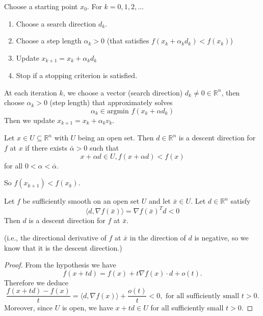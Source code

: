 Choose a starting point $x_0$. For $k = 0,1,2,\ldots$
\begin{enumerate}
  \item Choose a search direction $d_k$.
  \item Choose a step length $\alpha_k > 0$ (that satisfies $f(x_k + \alpha_k d_k) < f(x_k)$)
  \item Update $x_{k+1} = x_k + \alpha_k d_k$
  \item Stop if a stopping criterion is satisfied.
\end{enumerate}
\begin{definition}
  At each iteration $k$, we choose a vector (search direction) $d_k \neq 0 \in \mathbb R^n$, then choose $\alpha_k > 0$ (step length) that approximately solves
$$\alpha_k \in \text{argmin } f(x_k + \alpha d_k)$$
Then we update $x_{k+1} = x_k + \alpha_k v_k$.
\end{definition}
\begin{definition}
  Let $x \in U \subseteq \mathbb R^n$ with $U$ being an open set. Then $d \in \mathbb R^n$ is a descent direction for $f$ at $x$ if there exists $\bar \alpha > 0$ such that $$x + \alpha d \in U, f(x + \alpha d) < f(x)$$ for all $0 < \alpha < \bar \alpha$.

  \bigskip So $f(x_{k+1}) < f(x_k)$.
\end{definition}
\begin{lemma}
  Let $f$ be sufficiently smooth on an open set $U$ and let $\bar x \in U$. Let $d \in \mathbb R^n$ satisfy $$\langle d, \nabla f(\bar x) \rangle = \nabla f(\bar x)^T d < 0$$ Then $d$ is a descent direction for $f$ at $\bar x$.

  \bigskip (i.e., the directional derivative of $f$ at $\bar x$ in the direction of $d$ is negative, so we know that it is the descent direction.)
\end{lemma}

\begin{proof}
  From the hypothesis we have
\[
f(x + td) = f(x) + t \nabla f(x) \cdot d + o(t).
\]
Therefore we deduce
\[
\frac{f(x + td) - f(x)}{t} = \langle d, \nabla f(x) \rangle + \frac{o(t)}{t} < 0, \text{ for all sufficiently small } t > 0.
\]
Moreover, since $U$ is open, we have $x + td \in U$ for all sufficiently small $t > 0$.
\end{proof}

